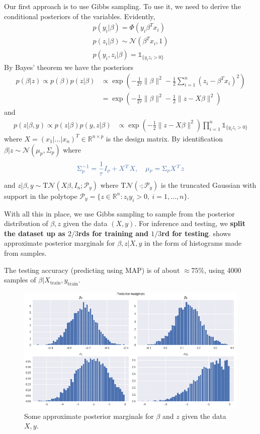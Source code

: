 \documentclass[11pt]{article}
\newcommand\RR{\mathbb{R}}
\newcommand{\calP}{\mathcal{P}}
\newcommand{\calN}{\mathcal{N}}
\newcommand{\bluefont}{\color{darkblue}}
\begin{document}
Our first approach is to use Gibbs sampling. To use it, we need to derive the conditional posteriors of the variables.
Evidently,
\begin{align*}
	p(y_i|\beta)
	= \Phi(y_i\beta^Tx_i)  \\
	p(z_i | \beta)  \sim \calN(\beta^T x_i, 1)  \\
	p(y_i,z_i|\beta) = \mathds{1}_{\{y_iz_i > 0\}}
\end{align*}
By Bayes' theorem we have the posteriors
\begin{align*}
	p(\beta|z) \propto p(\beta)p(z|\beta)
	&\propto \exp\left(
		-\frac1{2\tau}\|\beta\|^2
		-\frac{1}{2}\sum_{i=1}^{n}(z_i - \beta^T x_i)^2
	\right)  \\
	&= \exp\left(
		-\frac1{2\tau}\|\beta\|^2
		-\frac{1}{2}\|z - X\beta\|^2
	\right)
\end{align*}
and
\begin{align*}
	p(z|\beta,y) \propto p(z|\beta)p(y,z|\beta)
	&\propto \exp\left(
	-\frac{1}{2}\|z - X\beta\|^2
	\right) \prod_{i=1}^{n} \mathds{1}_{\{y_iz_i > 0\}}
\end{align*}
where $X = (x_1|\ldots|x_n)^T \in \RR^{n \times p}$ is the design matrix. By identification $\beta|z \sim \calN(\mu_p, \Sigma_p)$ where
\begin{equation}\label{eq:BetaPostZ}
\bluefont
	\Sigma_p^{-1} = \frac{1}{\tau}I_p + X^TX,
	\quad
	\mu_p = \Sigma_p X^Tz
\end{equation}
and $z|\beta,y \sim \mathrm{T}\calN(X\beta, I_n; \calP_y)$ where $\mathrm{T}\calN(\cdot; \calP_y)$ is the truncated Gaussian with support in the polytope $\calP_y = \{z\in\RR^n : z_i y_i > 0,\ i=1,\ldots,n\}$.

With all this in place, we use Gibbs sampling to sample from the posterior distribution of $\beta,z$ given the data $(X,y)$.
For inference and testing, we \textbf{\boldmath split the dataset up as $2/3$rds for training and $1/3$rd for testing}.  shows approximate posterior marginals for $\beta,z | X,y$ in the form of histograms made from samples.

The testing accuracy (predicting using MAP) is of about $\approx 75\%$, using 4000 samples of $\beta|X_\mathrm{train},y_\mathrm{train}$.

\begin{figure}
	\centering
	\includegraphics[width=.96\linewidth]{images/posterior_distribution_gibbs.png}
	\caption{Some approximate posterior marginals for $\beta$ and $z$ given the data $X, y$.}\label{fig:GibbsMarginals}
\end{figure}
\end{document}
